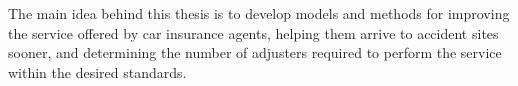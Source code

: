 The main idea behind this thesis
is to develop models and methods
for improving the service offered by car insurance agents,
helping them arrive to accident sites sooner,
and determining the number of adjusters required
to perform the service within the desired standards.
